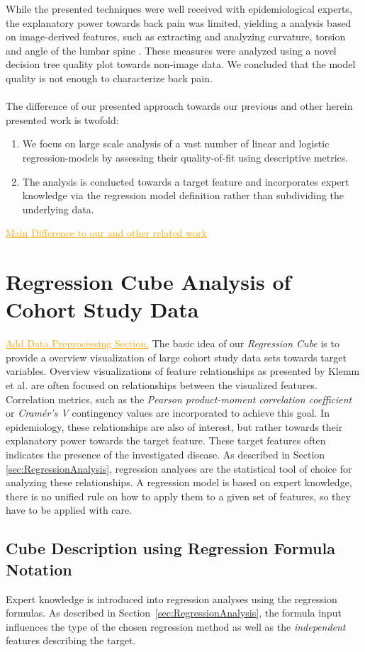 \documentclass[journal]{style/vgtc} 			          %
\newcommand{\com}[1]{\textcolor{orange}{\uline{#1}}}
\begin{document}
While the presented techniques were well received with epidemiological experts, the explanatory power towards back pain was limited, yielding a analysis based on image-derived features, such as extracting and analyzing curvature, torsion and angle of the lumbar spine \cite{Klemm2015}.
These measures were analyzed using a novel decision tree quality plot towards non-image data.
We concluded that the model quality is not enough to characterize back pain.
\\\\
The difference of our presented approach towards our previous and other herein presented work is twofold:
\begin{enumerate}
	\item We focus on large scale analysis of a vast number of linear and logistic regression-models by assessing their quality-of-fit using descriptive metrics.
	\item The analysis is conducted towards a target feature and incorporates expert knowledge via the regression model definition rather than subdividing the underlying data.
\end{enumerate}
\com{Main Difference to our and other related work}
\section{Regression Cube Analysis of Cohort Study Data}
\com{Add Data Preprocessing Section.}
The basic idea of our \emph{Regression Cube} is to provide a overview visualization of large cohort study data sets towards target variables.
Overview visualizations of feature relationships as presented by Klemm et al. \cite{Klemm2014VIS} are often focused on relationships between the visualized features.
Correlation metrics, such as the \emph{Pearson product-moment correlation coefficient} or \emph{Cram\'{e}r's V} contingency values are incorporated to achieve this goal.
In epidemiology, these relationships are also of interest, but rather towards their explanatory power towards the target feature.
These target features often indicates the presence of the investigated disease.
As described in Section \ref{sec:RegressionAnalysis}, regression analyses are the statistical tool of choice for analyzing these relationships.
A regression model is based on expert knowledge, there is no unified rule on how to apply them to a given set of features, so they have to be applied with care.
\subsection{Cube Description using Regression Formula Notation}
Expert knowledge is introduced into regression analyses using the regression formulas.
As described in Section~\ref{sec:RegressionAnalysis}, the formula input influences the type of the chosen regression method as well as the \emph{independent} features describing the target.
\end{document}
